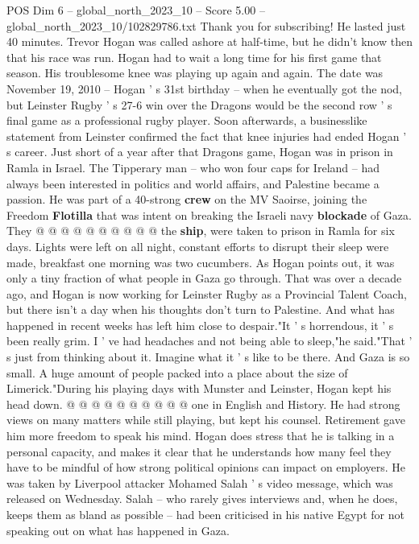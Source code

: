 \begin{textsample}{POS Dim 6 – global\_north\_2023\_10 – Score 5.00 – global\_north\_2023\_10/102829786.txt}  \label{ex:f6_pos_208}
Thank you for subscribing!
He lasted just 40 minutes.
Trevor Hogan was called ashore at half-time, but he didn't know then that his race was run.
Hogan had to wait a long time for his first game that season.
His troublesome knee was playing up again and again.
The date was November 19, 2010 -- Hogan ' s 31st birthday -- when he eventually got the nod, but Leinster Rugby ' s 27-6 win over the Dragons would be the second row ' s final game as a professional rugby player.
Soon afterwards, a businesslike statement from Leinster confirmed the fact that knee injuries had ended Hogan ' s career.
Just short of a year after that Dragons game, Hogan was in prison in Ramla in Israel.
The Tipperary man -- who won four caps for Ireland -- had always been interested in politics and world affairs, and Palestine became a passion.
He was part of a 40-strong \textbf{crew} on the MV Saoirse, joining the Freedom \textbf{Flotilla} that was intent on breaking the Israeli navy \textbf{blockade} of Gaza.
They @ @ @ @ @ @ @ @ @ @ the \textbf{ship}, were taken to prison in Ramla for six days.
Lights were left on all night, constant efforts to disrupt their sleep were made, breakfast one morning was two cucumbers.
As Hogan points out, it was only a tiny fraction of what people in Gaza go through.
That was over a decade ago, and Hogan is now working for Leinster Rugby as a Provincial Talent Coach, but there isn't a day when his thoughts don't turn to Palestine.
And what has happened in recent weeks has left him close to despair."It ' s horrendous, it ' s been really grim.
I ' ve had headaches and not being able to sleep,"he said."That ' s just from thinking about it.
Imagine what it ' s like to be there.
And Gaza is so small.
A huge amount of people packed into a place about the size of Limerick."During his playing days with Munster and Leinster, Hogan kept his head down. @ @ @ @ @ @ @ @ @ @ one in English and History.
He had strong views on many matters while still playing, but kept his counsel.
Retirement gave him more freedom to speak his mind.
Hogan does stress that he is talking in a personal capacity, and makes it clear that he understands how many feel they have to be mindful of how strong political opinions can impact on employers.
He was taken by Liverpool attacker Mohamed Salah ' s video message, which was released on Wednesday.
Salah -- who rarely gives interviews and, when he does, keeps them as bland as possible -- had been criticised in his native Egypt for not speaking out on what has happened in Gaza.

\end{textsample}
